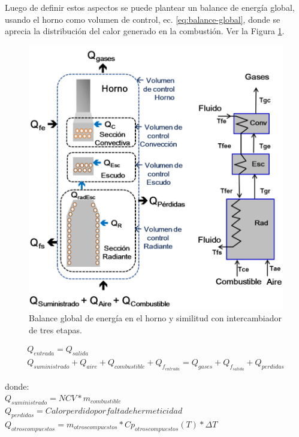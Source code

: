 \par Luego de definir estos aspectos se puede plantear un balance de energía global, usando el horno como volumen de control, ec. \ref{eq:balance-global}, donde se aprecia la distribución del calor generado en la combustión. Ver la Figura \ref{fig:balance-energic}.

\begin{figure}[hbt]
\begin{center}
\includegraphics[scale=0.38]{images/balance-energic}
\caption[Balance de energía del horno]{Balance global de energía en el horno y similitud con intercambiador de tres etapas.}
\label{fig:balance-energic}
\end{center}
\end{figure}

\begin{equation}
    \label{eq:balance-global}
    \begin{gathered}
    Q_{entrada} = Q_{salida}\\
    Q_{suministrado} + Q_{aire} + Q_{combustible} + Q_{f_{entrada}} = 
    Q_{gases} + Q_{f_{salida}} + Q_{perdidas}
    \end{gathered}
\end{equation}

donde:\\
$Q_{suministrado} = NCV * m_{combustible}$\\
$Q_{perdidas} = Calor perdido por falta de hermeticidad$\\
$Q_{otros compuestos} = m_{otros compuestos} * Cp_{otros compuestos}(T) * \Delta T$

